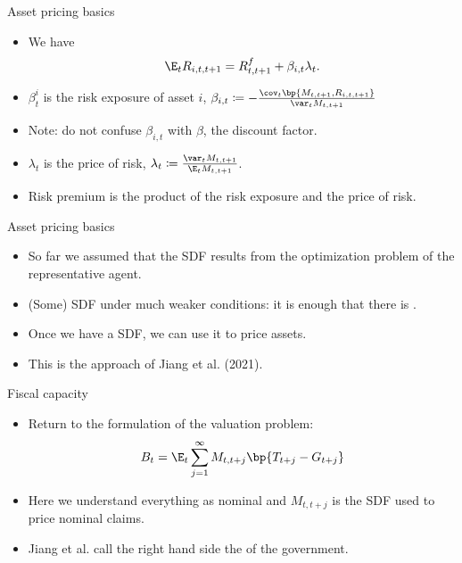 \documentclass[11pt,xcolor={dvipsnames},aspectratio=159,hyperref={pdftex,pdfpagemode=UseNone,hidelinks,pdfdisplaydoctitle=true},usepdftitle=false]{beamer}
\begin{document}
\begin{frame}{Asset pricing basics}  
    \begin{itemize}
        \item We have
            \begin{align*}
            \E_t R_{i,t,t+1} = R^f_{t,t+1} + \beta_{i,t} \lambda_t.
        \end{align*}
        \item $\beta^i_t$ is the risk exposure of asset $i$, $\beta_{i,t} \coloneq - \frac{\cov_t \bp{M_{t,t+1}, R_{i,t,t+1}}}{\var_t M_{t,t+1}}$ 
        \item Note: do not confuse $\beta_{i,t}$ with $\beta$, the discount factor. 
        \item $\lambda_t$ is the price of risk, $\lambda_t \coloneq \frac{\var_t M_{t,t+1}}{\E_t M_{t,t+1}}$.
        \item Risk premium is the product of the risk exposure and the price of risk.
    \end{itemize}
\end{frame}



\begin{frame}{Asset pricing basics}  
    \begin{itemize}
        \item So far we assumed that the SDF results from the optimization problem of the representative agent.
        \item (Some) SDF  under much weaker conditions: it is enough that there is .
        \item Once we have a SDF, we can use it to price assets. 
        \item This is the approach of Jiang et al. (2021). 
    \end{itemize}
\end{frame}

\begin{frame}{Fiscal capacity}  
    \begin{itemize}
        \item Return to the formulation of the valuation problem: 
        \begin{align*}
                B_t = \E_t \sum_{j=1}^\infty M_{t,t+j} \bp{T_{t+j}-G_{t+j}}
        \end{align*}
        \item Here we understand everything as nominal and $M_{t,t+j}$ is the SDF used to price nominal claims.
        \item Jiang et al. call the right hand side the  of the government.
     \end{itemize}
\end{frame}
\end{document}
